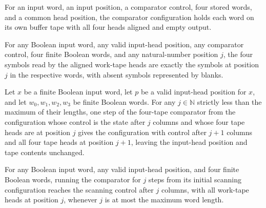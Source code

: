 \begin{definition}
\label{Complexity.clCmpCfg}
\leanok
{}
For an input word, an input position, a comparator control, four stored words, and a common head position, the comparator configuration holds each word on its own buffer tape with all four heads aligned and empty output.
\end{definition}

\begin{lemma}
\label{Complexity.clCmp_read}
\leanok
{}
For any Boolean input word, any valid input-head position, any comparator control, four
finite Boolean words, and any natural-number position $j$, the four symbols read by the
aligned work-tape heads are exactly the symbols at position $j$ in the respective words,
with absent symbols represented by blanks.
\end{lemma}

\begin{lemma}
\label{Complexity.clCmp_forward_step}
\leanok
{}
Let $x$ be a finite Boolean input word, let $p$ be a valid input-head position for $x$,
and let $w_0,w_1,w_2,w_3$ be finite Boolean words. For any $j\in\mathbb{N}$ strictly
less than the maximum of their lengths, one step of the four-tape comparator from the
configuration whose control is the state after $j$ columns and whose four tape heads are
at position $j$ gives the configuration with control after $j+1$ columns and all four
tape heads at position $j+1$, leaving the input-head position and tape contents
unchanged.
\end{lemma}

\begin{lemma}
\label{Complexity.clCmp_forward}
\leanok
{}
For any Boolean input word, any valid input-head position, and four finite Boolean
words, running the comparator for $j$ steps from its initial scanning configuration
reaches the scanning control after $j$ columns, with all work-tape heads at position
$j$, whenever $j$ is at most the maximum word length.
\end{lemma}

